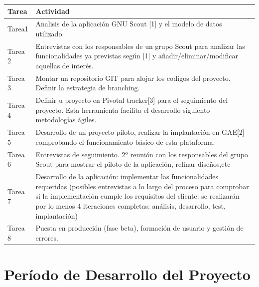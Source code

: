\begin{tabular}{|p{25mm}|p{80mm}|} \hline 
\textbf{Tarea } & \textbf{Actividad} \\ \hline
Tarea1 &
Analisis de la aplicación GNU Scout [1] y el modelo de datos utilizado.
\\
\hline

Tarea 2 &
Entrevistas con los responsables de un grupo Scout para analizar las funcionalidades ya
previstas según [1] y añadir/eliminar/modificar aquellas de interés.
\\
\hline

Tarea 3 &
Montar un repositorio GIT \cite{URL:GitHub} para alojar los codigos del proyecto. Definir la
estrategia de branching.
\\
\hline

Tarea 4 &
Definir u proyecto en Pivotal tracker[3] para el seguimiento del proyecto. Esta herramienta
facilita el desarrollo siguiento metodologías ágiles.
\\
\hline

Tarea 5 & 
Desarrollo de un proyecto piloto, realizar la implantación en GAE[2] comprobando el 
funcionamiento básico de esta plataforma.
\\
\hline

Tarea 6 &
Entrevistas de seguimiento. 2º reunión con los responsables del grupo Scout para
mostrar el piloto de la aplicación, refinar diseños,etc
\\
\hline

Tarea 7 &
Desarrollo de la aplicación: implementar las funcionalidades requeridas (posibles
entrevistas a lo largo del proceso para comprobar si la implementación cumple los requisitos
del cliente: se realizarán por lo menos 4 iteraciones completas: análisis, desarrollo, test, implantación)
\\
\hline

Tarea 8 &
Puesta en producción (fase beta), formación de usuario y gestión de errores.
\\
\hline

\end{tabular}


\section{Período de Desarrollo del Proyecto}
\label{1:sec:4}

